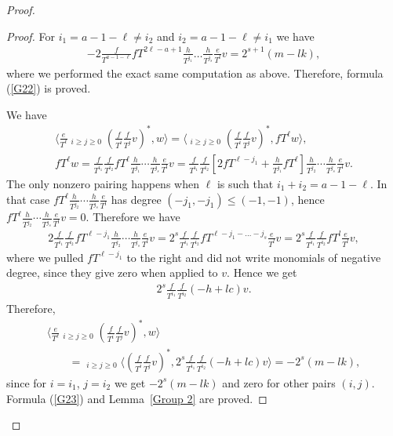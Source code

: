 \documentclass[11pt]{article}
\numberwithin{equation}{section}
\begin{document}
\begin{proof}
\begin{proof}
For $i_1 = a-1-\ell \ne i_2$ and $i_2 = a-1-\ell \ne i_1$ we have
\begin{gather*}
- 2 \frac{f}{T^{a-1-\ell}} fT^{2\ell-a+1} \frac{h}{T^{j_1}} \dots \frac{h}{T^{j_s}} \frac{e}{T^l} v = 2^{s+1} (m - lk),
\end{gather*}
where we performed the exact same computation as above. Therefore, formula (\ref{G22}) is proved.

We have
\begin{gather*}
 \bigg\langle \frac{e}{T^{\ell}} \mathop{\sum_{i+j=a-1-\ell}}_{i\geq j\geq 0} \left(\frac{f}{T^i}\frac{f}{T^j}v\right)^*, w \bigg\rangle = \bigg\langle \mathop{\sum_{i+j=a-1-\ell}}_{i\geq j\geq 0} \left(\frac{f}{T^i}\frac{f}{T^j}v\right)^*, fT^{\ell} w \bigg\rangle, \\
fT^{\ell} w = \frac{f}{T^{i_1}}\frac{f}{T^{i_2}} fT^{\ell} \frac{h}{T^{j_1}} \cdots \frac{h}{T^{j_s}} \frac{e}{T^l} v = \frac{f}{T^{i_1}}\frac{f}{T^{i_2}} \left[ 2 fT^{\ell-j_1} +\frac{h}{T^{j_1}} fT^\ell \right] \frac{h}{T^{j_2}} \cdots \frac{h}{T^{j_s}} \frac{e}{T^l} v.
\end{gather*}
The only nonzero pairing happens when $\ell$ is such that $i_1+i_2 = a-1-\ell$. In that case $fT^{\ell} \frac{h}{T^{j_2}} \cdots \frac{h}{T^{j_s}} \frac{e}{T^l}$ has degree $(-j_1, -j_1) \leq (-1,-1)$, hence $fT^{\ell} \frac{h}{T^{j_2}} \cdots \frac{h}{T^{j_s}} \frac{e}{T^l}v=0$. Therefore we have
\begin{gather*}
2 \frac{f}{T^{i_1}}\frac{f}{T^{i_2}} fT^{\ell-j_1} \frac{h}{T^{j_2}} \cdots \frac{h}{T^{j_s}} \frac{e}{T^l} v = 2^s \frac{f}{T^{i_1}}\frac{f}{T^{i_2}} fT^{\ell-j_1 - \dots - j_s} \frac{e}{T^l} v = 2^s \frac{f}{T^{i_1}}\frac{f}{T^{i_2}} fT^{l} \frac{e}{T^l} v,
\end{gather*}
where we pulled $fT^{\ell-j_1}$ to the right and did not write monomials of negative degree, since they give zero when applied to $v$. Hence we get
\begin{gather*}
2^s \frac{f}{T^{i_1}}\frac{f}{T^{i_2}} (-h +lc) v.
\end{gather*}
Therefore,
\begin{gather*}
\bigg\langle \frac{e}{T^{\ell}} \mathop{\sum_{i+j=a-1-\ell}}_{i\geq j\geq 0} \left(\frac{f}{T^i}\frac{f}{T^j}v\right)^*, w \bigg\rangle \\
\qquad{} = \mathop{\sum_{i+j=a-1-\ell}}_{i\geq j\geq 0}\bigg\langle \left(\frac{f}{T^i}\frac{f}{T^j}v\right)^*, 2^s \frac{f}{T^{i_1}}\frac{f}{T^{i_2}} (-h +lc) v \bigg\rangle = - 2^{s} (m - lk),
\end{gather*}
since for $i = i_1$, $j = i_2$ we get $-2^s (m - lk)$ and zero for other pairs $(i,j)$. Formula (\ref{G23}) and Lemma~\ref{Group 2} are proved.
\end{proof}


\end{proof}
\end{document}
